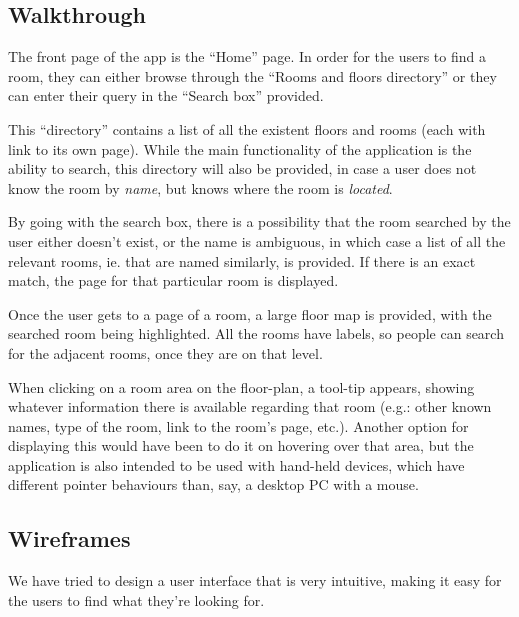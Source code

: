 \documentclass{sig-alt-release2}
\begin{document}
\subsection*{Walkthrough}
The front page of the app is the ``Home'' page. In order for the users to 
find a room, they can either browse through the ``Rooms and floors
directory'' or they can enter their query in the ``Search box'' provided.

This ``directory'' contains a list of all the existent floors and rooms (each
with link to its own page). While the main functionality of the application is
the ability to search, this directory will also be provided, in case a
user does not know the room by \emph{name}, but knows where the room is \emph{
located}.

By going with the search box, there is a possibility that the room searched by
the user either doesn't exist, or the name is ambiguous, in which case a list
of all the relevant rooms, ie. that are named similarly, is provided.
If there is an exact match, the page for that particular room is displayed.

Once the user gets to a page of a room, a large floor map is provided, with
the searched room being highlighted. All the rooms have labels, so people can
search for the adjacent rooms, once they are on that level.

When clicking on a room area on the floor-plan, a tool-tip appears, showing 
whatever information there is available regarding that room (e.g.: other known
names, type of the room, link to the room's page, etc.). Another option for
displaying this would have been to do it on hovering over that area, but the 
application is also intended to be used with hand-held devices, which have different
pointer behaviours than, say, a desktop PC with a mouse.

\subsection*{Wireframes}
We have tried to design a user interface that is very intuitive, making it
easy for the users to find what they're looking for.
\end{document}
